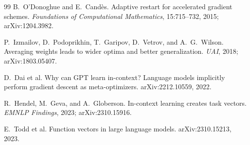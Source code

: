 \documentclass[11pt]{article}
\begin{document}
\begin{thebibliography}{99}
 B.~O'Donoghue and E.~Cand\`es.
Adaptive restart for accelerated gradient schemes.
\emph{Foundations of Computational Mathematics}, 15:715--732, 2015;
arXiv:1204.3982.

 P.~Izmailov, D.~Podoprikhin, T.~Garipov,
D.~Vetrov, and A.~G.~Wilson.
Averaging weights leads to wider optima and better generalization.
\emph{UAI}, 2018; arXiv:1803.05407.

 D.~Dai et al.
Why can GPT learn in-context? Language models implicitly perform gradient descent as
meta-optimizers. arXiv:2212.10559, 2022.

 R.~Hendel, M.~Geva, and A.~Globerson.
In-context learning creates task vectors. \emph{EMNLP Findings}, 2023; arXiv:2310.15916.

 E.~Todd et al.
Function vectors in large language models. arXiv:2310.15213, 2023.

\end{thebibliography}
\end{document}
